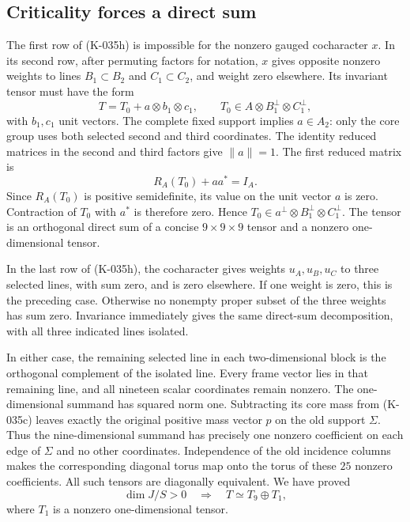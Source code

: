 \subsection*{Criticality forces a direct sum}

The first row of (K-035h) is impossible for the nonzero gauged
cocharacter $x$.  In its second row, after permuting factors for
notation, $x$ gives opposite nonzero weights to lines
$B_1\subset B_2$ and $C_1\subset C_2$, and weight zero elsewhere.
Its invariant tensor must have the form
\[
       T=T_0+a\otimes b_1\otimes c_1,
 \qquad T_0\in A\otimes B_1^\perp\otimes C_1^\perp,
                                                               \tag{K-035i}
\]
with $b_1,c_1$ unit vectors.  The complete fixed support implies
$a\in A_2$: only the core group uses both selected second and
third coordinates.  The identity reduced matrices in the second
and third factors give $\|a\|=1$.  The first reduced matrix is
\[
                         R_A(T_0)+aa^*=I_A.
\]
Since $R_A(T_0)$ is positive semidefinite, its value on the unit
vector $a$ is zero.  Contraction of $T_0$ with $a^*$ is therefore
zero.  Hence $T_0\in a^\perp\otimes B_1^\perp\otimes C_1^\perp$.
The tensor is an orthogonal direct sum of a concise
$9\times9\times9$ tensor and a nonzero one-dimensional tensor.

In the last row of (K-035h), the cocharacter gives weights
$u_A,u_B,u_C$ to three selected lines, with sum zero, and is
zero elsewhere.  If one weight is zero, this is the preceding
case.  Otherwise no nonempty proper subset of the three weights
has sum zero.  Invariance immediately gives the same direct-sum
decomposition, with all three indicated lines isolated.

In either case, the remaining selected line in each
two-dimensional block is the orthogonal complement of the
isolated line.  Every frame vector lies in that remaining line,
and all nineteen scalar coordinates remain nonzero.  The
one-dimensional summand has squared norm one.  Subtracting its
core mass from (K-035c) leaves exactly the original positive
mass vector $p$ on the old support $\Sigma$.  Thus the
nine-dimensional summand has precisely one nonzero coefficient
on each edge of $\Sigma$ and no other coordinates.  Independence
of the old incidence columns makes the corresponding diagonal
torus map onto the torus of these $25$ nonzero coefficients.
All such tensors are diagonally equivalent.  We have proved
\[
               \dim J/S>0\quad\Longrightarrow\quad
                         T\simeq T_9\oplus T_1,         \tag{K-035j}
\]
where $T_1$ is a nonzero one-dimensional tensor.

